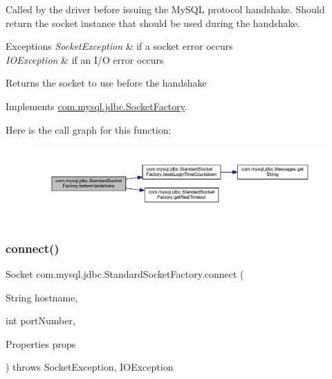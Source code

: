 Called by the driver before issuing the My\+S\+QL protocol handshake. Should return the socket instance that should be used during the handshake.


\begin{DoxyExceptions}{Exceptions}
{\em Socket\+Exception} & if a socket error occurs \\
\hline
{\em I\+O\+Exception} & if an I/O error occurs\\
\hline
\end{DoxyExceptions}
\begin{DoxyReturn}{Returns}
the socket to use before the handshake 
\end{DoxyReturn}


Implements \mbox{\hyperlink{interfacecom_1_1mysql_1_1jdbc_1_1_socket_factory_aa9a78553a76681f49c734aaa3f8f126b}{com.\+mysql.\+jdbc.\+Socket\+Factory}}.

Here is the call graph for this function\+:
\nopagebreak
\begin{figure}[H]
\begin{center}
\leavevmode
\includegraphics[width=350pt]{classcom_1_1mysql_1_1jdbc_1_1_standard_socket_factory_a0fc01cf46005340dec4113471621f792_cgraph}
\end{center}
\end{figure}
\mbox{\label{classcom_1_1mysql_1_1jdbc_1_1_standard_socket_factory_a3b3577f8cc0de73aa70e6f672e066c6f}} 
\subsubsection{\texorpdfstring{connect()}{connect()}}
{\footnotesize\ttfamily Socket com.\+mysql.\+jdbc.\+Standard\+Socket\+Factory.\+connect (\begin{DoxyParamCaption}\item[{String}]{hostname,  }\item[{int}]{port\+Number,  }\item[{Properties}]{props }\end{DoxyParamCaption}) throws Socket\+Exception, I\+O\+Exception}

